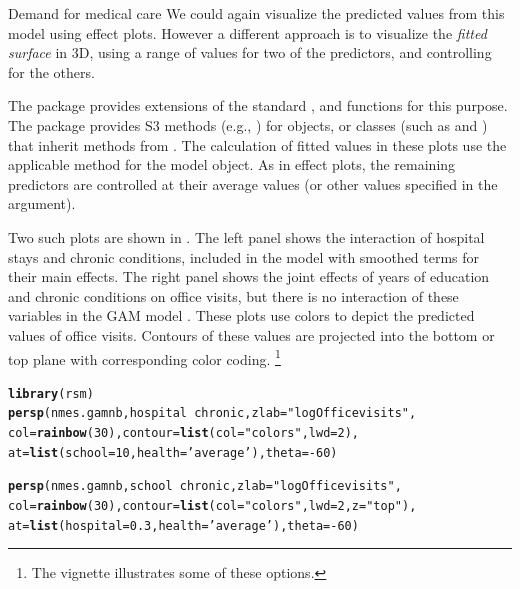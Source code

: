 \documentclass[11pt]{book}\usepackage[]{graphicx}\usepackage[]{color}
\makeatletter
\newcommand{\hlnum}[1]{\textcolor[rgb]{0.686,0.059,0.569}{#1}}%
\newcommand{\hlstr}[1]{\textcolor[rgb]{0.192,0.494,0.8}{#1}}%
\newcommand{\hlopt}[1]{\textcolor[rgb]{0,0,0}{#1}}%
\newcommand{\hlstd}[1]{\textcolor[rgb]{0.345,0.345,0.345}{#1}}%
\newcommand{\hlkwc}[1]{\textcolor[rgb]{0.333,0.667,0.333}{#1}}%
\newcommand{\hlkwd}[1]{\textcolor[rgb]{0.737,0.353,0.396}{\textbf{#1}}}%
\newenvironment{kframe}{%
 \def\at@end@of@kframe{}%
 \ifinner\ifhmode%
  \def\at@end@of@kframe{\end{minipage}}%
  \begin{minipage}{\columnwidth}%
 \fi\fi%
 \def\FrameCommand##1{\hskip\@totalleftmargin \hskip-\fboxsep
 \colorbox{shadecolor}{##1}\hskip-\fboxsep
     \hskip-\linewidth \hskip-\@totalleftmargin \hskip\columnwidth}%
 \MakeFramed {\advance\hsize-\width
   \@totalleftmargin\z@ \linewidth\hsize
   \@setminipage}}%
 {\par\unskip\endMakeFramed%
 \at@end@of@kframe}
\newenvironment{knitrout}{}{} %
\renewenvironment{knitrout}{\small\renewcommand{\baselinestretch}{.85}}{} %
\makeatother
\begin{document}
\begin{Example}[nmes3]{Demand for medical care}
We could again visualize the predicted values from this model using effect plots. However a
different approach is to visualize the \emph{fitted surface} in 3D, using a range of
values for two of the predictors, and controlling for the others.

The  package provides extensions of the standard , 
and  functions for this purpose.  The package provides S3 methods
(e.g., ) for
 objects, or classes (such as  and )
that inherit methods from .  The calculation of fitted values in these
plots use the applicable  method for the model object.
As in effect plots, the remaining predictors are controlled at their average
values (or other values specified in the  argument).

Two such plots are shown in . The left panel shows the interaction of
hospital stays and chronic conditions, included in the model with smoothed terms for their
main effects.  The right panel shows the joint effects of years of education and chronic
conditions on office visits, but there is no interaction of these variables in the GAM model
.
These plots use  colors to depict the predicted values of office visits.
Contours of these values are projected into the bottom or top plane with corresponding
color coding.%
\footnote{The vignette  illustrates some of these options.
}
\begin{knitrout}
\color{fgcolor}\begin{kframe}
\begin{alltt}
\hlkwd{library}\hlstd{(rsm)}
\hlkwd{persp}\hlstd{(nmes.gamnb, hospital} \hlopt{~} \hlstd{chronic,} \hlkwc{zlab}\hlstd{=}\hlstr{"log Office visits"}\hlstd{,}
  \hlkwc{col}\hlstd{=}\hlkwd{rainbow}\hlstd{(}\hlnum{30}\hlstd{),} \hlkwc{contour}\hlstd{=}\hlkwd{list}\hlstd{(}\hlkwc{col}\hlstd{=}\hlstr{"colors"}\hlstd{,} \hlkwc{lwd}\hlstd{=}\hlnum{2}\hlstd{),}
  \hlkwc{at}\hlstd{=}\hlkwd{list}\hlstd{(}\hlkwc{school}\hlstd{=}\hlnum{10}\hlstd{,} \hlkwc{health}\hlstd{=}\hlstr{'average'}\hlstd{),} \hlkwc{theta}\hlstd{=}\hlopt{-}\hlnum{60}\hlstd{)}

\hlkwd{persp}\hlstd{(nmes.gamnb, school} \hlopt{~} \hlstd{chronic,} \hlkwc{zlab}\hlstd{=}\hlstr{"log Office visits"}\hlstd{,}
        \hlkwc{col}\hlstd{=}\hlkwd{rainbow}\hlstd{(}\hlnum{30}\hlstd{),} \hlkwc{contour}\hlstd{=}\hlkwd{list}\hlstd{(}\hlkwc{col}\hlstd{=}\hlstr{"colors"}\hlstd{,} \hlkwc{lwd}\hlstd{=}\hlnum{2}\hlstd{,} \hlkwc{z}\hlstd{=}\hlstr{"top"}\hlstd{),}
  \hlkwc{at}\hlstd{=}\hlkwd{list}\hlstd{(}\hlkwc{hospital}\hlstd{=}\hlnum{0.3}\hlstd{,} \hlkwc{health}\hlstd{=}\hlstr{'average'}\hlstd{),} \hlkwc{theta}\hlstd{=}\hlopt{-}\hlnum{60}\hlstd{)}
\end{alltt}
\end{kframe}\begin{figure}[!htbp]



\end{figure}
\end{knitrout}
\end{Example}
\end{document}
